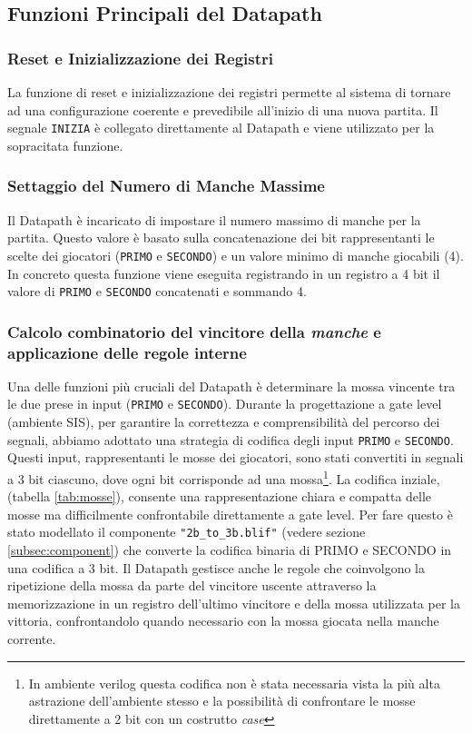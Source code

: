 \documentclass[a4paper]{report}
\begin{document}
\subsection{Funzioni Principali del Datapath}

\subsubsection{Reset e Inizializzazione dei Registri}
La funzione di reset e inizializzazione dei registri permette al sistema di tornare ad una configurazione coerente e prevedibile all'inizio di una nuova partita.
Il segnale \texttt{INIZIA} è collegato direttamente al Datapath e viene utilizzato per la sopracitata funzione.

\subsubsection{Settaggio del Numero di Manche Massime}
Il Datapath è incaricato di impostare il numero massimo di manche per la partita.
Questo valore è basato sulla concatenazione dei bit rappresentanti le scelte dei giocatori (\texttt{PRIMO} e \texttt{SECONDO}) e un valore minimo di manche giocabili (4).
In concreto questa funzione viene eseguita registrando in un registro a 4 bit il valore di \texttt{PRIMO} e \texttt{SECONDO} concatenati e sommando 4.

\subsubsection{Calcolo combinatorio del vincitore della \textit{manche} e applicazione delle regole interne}
Una delle funzioni più cruciali del Datapath è determinare la mossa vincente tra le due prese in input (\texttt{PRIMO} e \texttt{SECONDO}).
Durante la progettazione a gate level (ambiente SIS), per garantire la correttezza e comprensibilità del percorso dei segnali, abbiamo adottato una strategia di codifica degli input \texttt{PRIMO} e \texttt{SECONDO}.
Questi input, rappresentanti le mosse dei giocatori, sono stati convertiti in segnali a 3 bit ciascuno, dove ogni bit corrisponde ad una mossa\footnote{In ambiente verilog questa codifica non è stata necessaria vista la più alta astrazione dell'ambiente stesso e la possibilità di confrontare le mosse direttamente a 2 bit con un costrutto \textit{case}}.
La codifica inziale, (tabella \ref{tab:mosse}), consente una rappresentazione chiara e compatta delle mosse ma difficilmente confrontabile direttamente a gate level. Per fare questo è stato modellato il componente \texttt{"2b\_to\_3b.blif"} (vedere sezione \ref{subsec:component}) che converte la codifica binaria di PRIMO e SECONDO in una codifica a 3 bit.
Il Datapath gestisce anche le regole che coinvolgono la ripetizione della mossa da parte del vincitore uscente attraverso la memorizzazione in un registro dell'ultimo vincitore e della mossa utilizzata per la vittoria, confrontandolo quando necessario con la mossa giocata nella manche corrente. 
\end{document}

